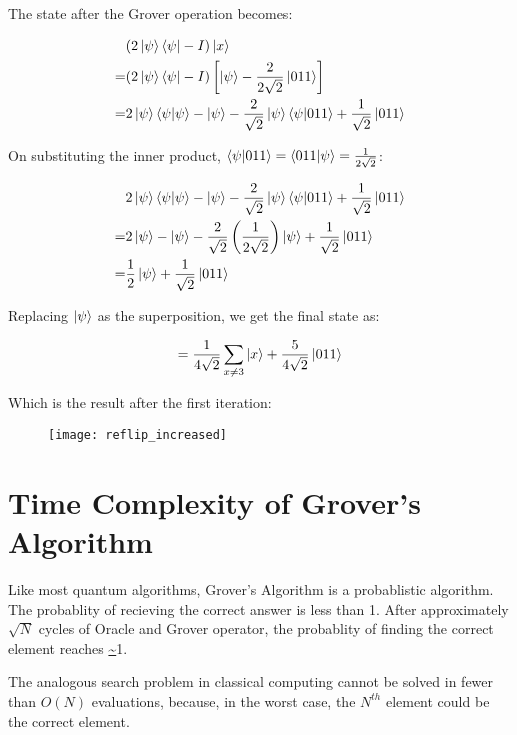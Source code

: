 \documentclass[a4paper]{article}
\begin{document}
\par

The state after the Grover operation becomes:

\begin{align*}
    & (2\ket{\psi}\bra{\psi} - I)\ket{x} \\
    = & (2\ket{\psi}\bra{\psi} - I) \left[ \ket{\psi} - \frac{2}{2\sqrt{2}}\ket{011} \right] \\
    = & 2\ket{\psi}\braket{\psi|\psi} - \ket{\psi} - \frac{2}{\sqrt{2}}\ket{\psi}\braket{\psi|011} + \frac{1}{\sqrt{2}}\ket{011}
\end{align*}

On substituting the inner product, $\braket{\psi|011} = \braket{011|\psi} = \frac{1}{2\sqrt{2}}$:

\begin{align*}
    & 2\ket{\psi}\braket{\psi|\psi} - \ket{\psi} - \frac{2}{\sqrt{2}}\ket{\psi}\braket{\psi|011} + \frac{1}{\sqrt{2}}\ket{011} \\
    = & 2\ket{\psi} - \ket{\psi} - \frac{2}{\sqrt{2}}\left(\frac{1}{2\sqrt{2}}\right)\ket{\psi} + \frac{1}{\sqrt{2}}\ket{011} \\
    = & \frac{1}{2}\ket{\psi} + \frac{1}{\sqrt{2}}\ket{011}
\end{align*}

Replacing $\ket{\psi}$ as the superposition, we get the final state as:

$$ = \frac{1}{4\sqrt{2}}\sum_{x \neq 3}{\ket{x}} + \frac{5}{4\sqrt{2}}\ket{011} $$

Which is the result after the first iteration:

\begin{figure}[h]
\texttt{[image: reflip\_increased]}
\centering
\end{figure}

\pagebreak

\section{ Time Complexity of Grover's Algorithm }

Like most quantum algorithms, Grover's Algorithm is a probablistic algorithm.
The probablity of recieving the correct answer is less than 1. After
approximately $\sqrt{N}$ cycles of Oracle and Grover operator, the probablity
of finding the correct element reaches \url{~}1.
\\
\par
The analogous search problem in classical computing cannot be solved in fewer
than $O(N)$ evaluations, because, in the worst case, the $N^{th}$ element could
be the correct element.
\\
\par
\end{document}
